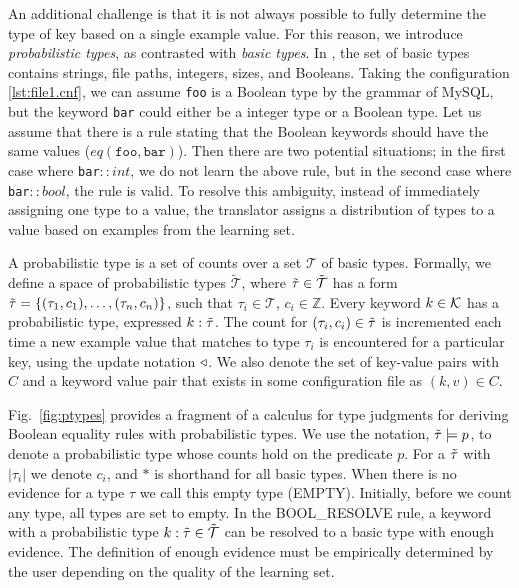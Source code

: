 An additional challenge is that it is not always possible to fully determine the type of key based on a single example value. 
For this reason, we introduce \textit{probabilistic types}, as contrasted with \textit{basic types}.
In \app, the set of basic types contains strings, file paths, integers, sizes, and Booleans. 
Taking the configuration \ref{lst:file1.cnf}, we can assume {\tt foo} is a Boolean type by the grammar of MySQL,
  but the keyword {\tt bar} could either be a integer type or a Boolean type.
Let us assume that there is a rule stating that the Boolean keywords should have the same values ($eq(\texttt{foo},\texttt{bar})$).
Then there are two potential situations; in the first case where {\tt bar}$::int$, we do not learn the above rule, but in the second case where {\tt bar}$::bool$, the rule is valid.
To resolve this ambiguity, instead of immediately assigning one type to a value, the translator assigns a distribution of types to a value based on examples from the learning set.


A probabilistic type is a set of counts over a set $\mathcal{T}$ of basic types.
Formally, we define a space of probabilistic types $\tilde{\mathcal{T}}$, where $\tilde{\tau} \in \tilde{\mathcal{T}}$ has a form $\tilde{\tau}=\{(\tau_1, c_1),\ldots,(\tau_n, c_n)\}$, such that $\tau_i \in \mathcal{T}$, $c_i \in \mathbb{Z}$. 
Every keyword $k\in\mathcal{K}$ has a probabilistic type, expressed $k:\tilde{\tau}$.
The count for $(\tau_i,c_i) \in \tilde{\tau}$ is incremented each time a new example value that matches to type $\tau_i$ is encountered for a particular key, using the update notation $\triangleleft$.
We also denote the set of key-value pairs with $C$ and a keyword value pair that exists in some configuration file as $(k,v) \in C$.

Fig.~\ref{fig:ptypes} provides a fragment of a calculus for type judgments for deriving Boolean equality rules with probabilistic types.
We use the notation, $\tilde{\tau} \models p$, to denote a probabilistic type whose counts hold on the predicate $p$. For a $\tilde{\tau}$ with $|\tau_i|$ 
we denote $c_i$, and $*$ is shorthand for all basic types. When there is no evidence for a type $\tau$ we call this empty type ({\scriptsize EMPTY}). Initially, before we count any type, all types are set to empty. 
In the {\scriptsize BOOL\_RESOLVE} rule, a keyword with a probabilistic type $k : \tilde{\tau} \in \tilde{\mathcal{T}}$ can be resolved to a basic type with enough evidence.
The definition of enough evidence must be empirically determined by the user depending on the quality of the learning set.

